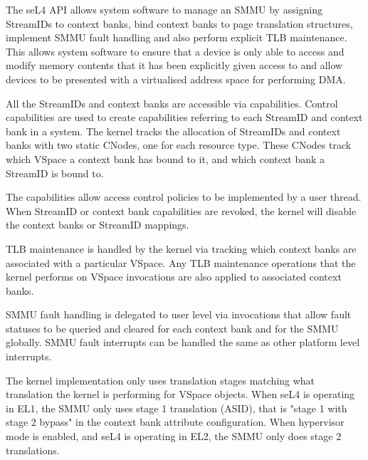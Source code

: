 The seL4 API allows system software to manage an SMMU by assigning StreamIDs to
context banks, bind context banks to page translation structures, implement
SMMU fault handling and also perform explicit TLB maintenance.
This allows system software to ensure that a device is only able to access and
modify memory contents that it has been explicitly given access to and allow
devices to be presented with a virtualised address space for performing DMA.

All the StreamIDs and context banks are accessible via capabilities. Control
capabilities are used to create capabilities referring to each StreamID and
context bank in a system. The kernel tracks the allocation of StreamIDs and
context banks with two static CNodes, one for each resource type. These CNodes
track which VSpace a context bank has bound to it, and which context bank a
StreamID is bound to.

The capabilities allow access control policies to be implemented by a user thread.
When StreamID or context bank capabilities are revoked, the kernel will disable
the context banks or StreamID mappings.

TLB maintenance is handled by the kernel via tracking which context banks are
associated with a particular VSpace. Any TLB maintenance operations that the
kernel performs on VSpace invocations are also applied to associated context
banks.

SMMU fault handling is delegated to user level via invocations that allow fault
statuses to be queried and cleared for each context bank and for the SMMU globally.
SMMU fault interrupts can be handled the same as other platform level interrupts.

The kernel implementation only uses translation stages matching what translation
the kernel is performing for VSpace objects. When seL4 is operating in EL1,
the SMMU only uses stage 1 translation (ASID), that is "stage 1 with stage 2
bypass" in the context bank attribute configuration. When hypervisor mode is
enabled, and seL4 is operating in EL2, the SMMU only does stage 2 translations.

